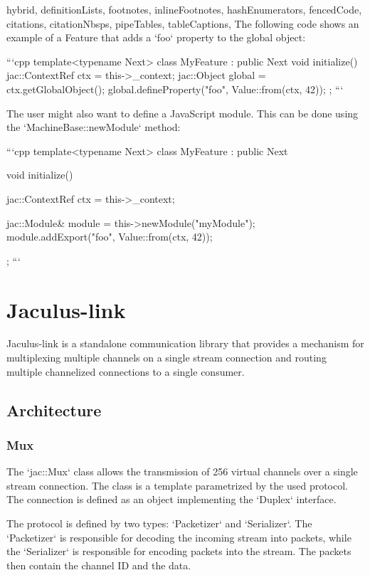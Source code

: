 \documentclass[
  digital,
  oneside,
  nosansbold,
  nocolorbold,
  lof,
  lot
]{fithesis4}
\begin{document}
\begin{markdown*}{%
  hybrid,
  definitionLists,
  footnotes,
  inlineFootnotes,
  hashEnumerators,
  fencedCode,
  citations,
  citationNbsps,
  pipeTables,
  tableCaptions,
}
The following code shows an example of a Feature that adds a `foo` property to the global object:

```cpp
template<typename Next>
class MyFeature : public Next {
    void initialize() {
        jac::ContextRef ctx = this->_context;
        jac::Object global = ctx.getGlobalObject();
        global.defineProperty("foo", Value::from(ctx, 42));
    }
};
```

The user might also want to define a JavaScript module. This can be done using the `MachineBase::newModule` method:

```cpp
template<typename Next>
class MyFeature : public Next {
    void initialize() {
        jac::ContextRef ctx = this->_context;

        jac::Module& module = this->newModule("myModule");
        module.addExport("foo", Value::from(ctx, 42));
    }
};
```


\chapter{Jaculus-link}

Jaculus-link is a standalone communication library that provides a mechanism for multiplexing multiple channels on a single stream connection and routing multiple channelized connections to a single consumer.



\section{Architecture}

\subsection{Mux}

The `jac::Mux` class allows the transmission of 256 virtual channels over a single stream connection. The class is a template parametrized by the used protocol. The connection is defined as an object implementing the `Duplex` interface.

The protocol is defined by two types: `Packetizer` and `Serializer`. The `Packetizer` is responsible for decoding the incoming stream into packets, while the `Serializer` is responsible for encoding packets into the stream. The packets then contain the channel ID and the data.


\end{markdown*}
\end{document}
